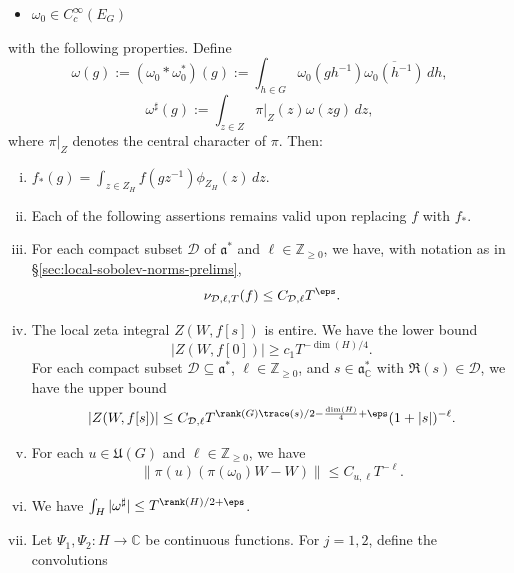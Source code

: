 \begin{theorem}
\begin{itemize}
  \item $\omega_0 \in C_c^\infty(E_G)$
  \end{itemize}
  with the following properties.  Define
  \begin{equation*}
    \omega(g) := (\omega_0 \ast \omega_0^*)(g) := \int_{h \in G} \omega_0(g h^{-1}) \overline{\omega_0(h^{-1})} \, d h,
  \end{equation*}
  \begin{equation*}
    \omega^\sharp (g) := \int_{z \in Z}
    \pi|_Z (z) \omega(z g) \, d z,
  \end{equation*}
  where $\pi|_Z$ denotes the central character of $\pi$.  Then:
  \begin{enumerate}[(i)]
  \item $f_{\ast}(g) = \int_{z \in Z_H} f(g z^{-1}) \phi_{Z_H}(z) \, d z$.
  \item Each of the following assertions remains valid upon replacing $f$ with $f_{\ast}$.
  \item For each compact subset $\mathcal{D}$ of $\mathfrak{a}^*$ and $\ell \in \mathbb{Z}_{\geq 0}$, we have, with notation as in \S\ref{sec:local-sobolev-norms-prelims},
    \begin{equation*}
      \nu_{\mathcal{D},\ell,T}(f) \leq C_{\mathcal{D},\ell} T^\eps.
    \end{equation*}
  \item The local zeta integral $Z(W,f[s])$ is entire.  We have the lower bound
    \begin{equation*}
      |Z(W,f[0])| \geq c_1 T^{- \dim(H)/4}.
    \end{equation*}
    For each compact subset $\mathcal{D} \subseteq \mathfrak{a}^*$, $\ell \in \mathbb{Z}_{\geq 0}$, and $s \in \mathfrak{a}_{\mathbb{C}}^*$ with $\Re(s) \in \mathcal{D}$, we have the upper bound
    \begin{equation*}
      |Z(W,f[s])| \leq C_{\mathcal{D},\ell} T^{\rank(G) \trace(s)/2 - \frac{\dim(H)}{4} + \eps }
      (1 + |s|)^{-\ell}.
    \end{equation*}
  \item For each $u \in \mathfrak{U}(G)$ and $\ell \in \mathbb{Z}_{\geq 0}$, we have
    \begin{equation*}
      \|\pi(u) ( \pi(\omega_0) W - W)\| \leq C_{u,\ell} T^{-\ell}.
    \end{equation*}
  \item We have $\int_{H} |\omega^\sharp| \leq T^{\rank(H)/2 + \eps}$.
  \item Let $\Psi_1, \Psi_2 : H \rightarrow \mathbb{C}$ be continuous functions.  For $j=1,2$, define the convolutions

\end{enumerate}
\end{theorem}
